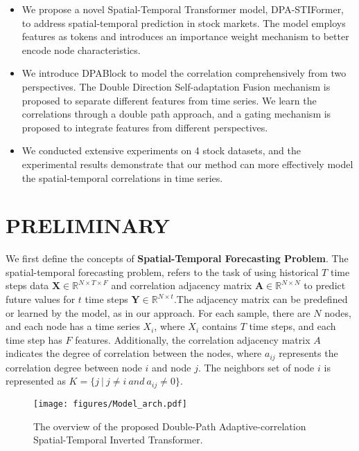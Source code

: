 \begin{itemize}
\item We propose a novel Spatial-Temporal Transformer model, DPA-STIFormer, to address spatial-temporal prediction in stock markets. The model employs features as tokens and introduces an importance weight mechanism to better encode node characteristics.

\item We introduce DPABlock to model the correlation comprehensively from two perspectives. The Double Direction Self-adaptation Fusion mechanism is proposed to separate different features from time series. We learn the correlations through a double path approach, and a gating mechanism is proposed to integrate features from different perspectives.

\item We conducted extensive experiments on 4 stock datasets, and the experimental results demonstrate that our method can more effectively model the spatial-temporal correlations in time series.
\end{itemize}

\section{PRELIMINARY}
We first define the concepts of \textbf{Spatial-Temporal Forecasting Problem}. The spatial-temporal forecasting problem, refers to the task of using historical $T$ time steps data $\boldsymbol{X}\in{\mathbb{R}^{N \times T \times F}}$ and correlation adjacency matrix $\boldsymbol{A}\in{\mathbb{R}^{N \times N}}$ to predict future values for $t$ time steps $\boldsymbol{Y}\in{\mathbb{R}^{N \times t}}$.The adjacency matrix can be predefined or learned by the model, as in our approach. For each sample, there are $N$ nodes, and each node has a time series $X_i$, where $X_i$ contains $T$ time steps, and each time step has $F$ features. Additionally, the correlation adjacency matrix $A$ indicates the degree of correlation between the nodes, where $a_{ij}$ represents the correlation degree between node $i$ and node $j$. The neighbors set of node $i$ is represented as $K=\{j\ |\ j \neq i \ and\  a_{ij} \neq 0\}$.

\begin{figure*}
    \centering
    \texttt{[image: figures/Model\_arch.pdf]}
    \caption{The overview of the proposed Double-Path Adaptive-correlation Spatial-Temporal Inverted Transformer.}
    \label{fig:arch}
\end{figure*}
